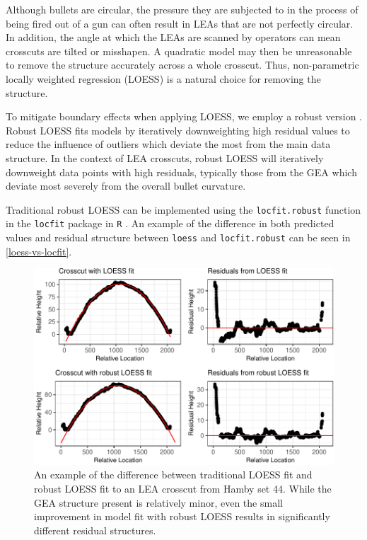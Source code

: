 \documentclass[12pt]{article}
\begin{document}
Although bullets are circular, the pressure they are subjected to in the
process of being fired out of a gun can often result in LEAs that are
not perfectly circular. In addition, the angle at which the LEAs are
scanned by operators can mean crosscuts are tilted or misshapen. A
quadratic model may then be unreasonable to remove the structure
accurately across a whole crosscut. Thus, non-parametric locally
weighted regression (LOESS) is a natural choice for removing the
structure.

To mitigate boundary effects when applying LOESS, we employ a robust
version \citep{Cleveland1}. Robust LOESS fits models by iteratively
downweighting high residual values to reduce the influence of outliers
which deviate the most from the main data structure. In the context of
LEA crosscuts, robust LOESS will iteratively downweight data points with
high residuals, typically those from the GEA which deviate most severely
from the overall bullet curvature.

Traditional robust LOESS can be implemented using the
\texttt{locfit.robust} function in the \texttt{locfit} package in
\texttt{R} \cite{locfit}. An example of the difference in both predicted
values and residual structure between \texttt{loess} and
\texttt{locfit.robust} can be seen in \autoref{loess-vs-locfit}.

\begin{figure}
\centering
\includegraphics{writeup_files/figure-latex/loess-vs-locfit-1.pdf}
\caption{\label{loess-vs-locfit}An example of the difference between
traditional LOESS fit and robust LOESS fit to an LEA crosscut from Hamby
set 44. While the GEA structure present is relatively minor, even the
small improvement in model fit with robust LOESS results in
significantly different residual structures.}
\end{figure}
\end{document}
